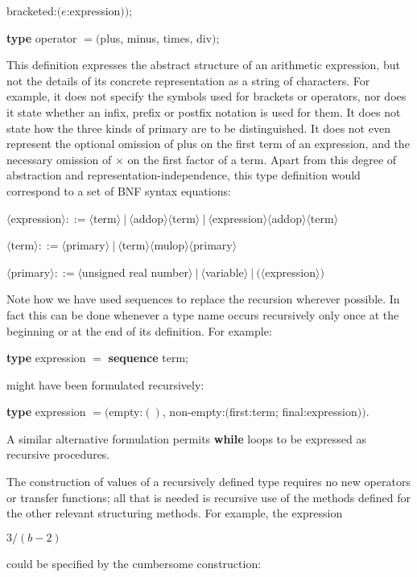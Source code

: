 \tabto*{9.3em}bracketed:$(e$:expression$))$;

\quad \textbf{type} operator $= ($plus, minus, times, div$)$;

This definition expresses the abstract structure of an arithmetic expression, but not the details of its concrete representation as a string of characters. For example, it does not specify the symbols used for brackets or operators, nor does it state whether an infix, prefix or postfix notation is used for them. It does not state how the three kinds of primary are to be distinguished. It does not even represent the optional omission of plus on the first term of an expression, and the necessary omission of $\times$ on the first factor of a term. Apart from this degree of abstraction and representation-independence, this type definition would correspond to a set of BNF syntax equations:

	\quad $\langle$expression$\rangle ::= \langle$term$\rangle\ |\ \langle$addop$\rangle \langle$term$\rangle\ |\ \langle$expression$\rangle \langle$addop$\rangle \langle$term$\rangle$

	\quad $\langle$term$\rangle ::= \langle$primary$\rangle\ |\ \langle$term$\rangle\langle$mulop$\rangle\langle$primary$\rangle$
	
	\quad $\langle$primary$\rangle ::= \langle$unsigned real number$\rangle\ |\ \langle$variable$\rangle\ |\ (\langle$expression$\rangle)$

Note how we have used sequences to replace the recursion wherever possible. In fact this can be done whenever a type name occurs recursively only once at the beginning or at the end of its definition. For example:

\quad \textbf{type} expression $=$ \textbf{sequence} term;

\noindent
might have been formulated recursively:

\quad \textbf{type} expression $= ($empty:$()$, non-empty:$($first:term; final:expression$))$.

\noindent
A similar alternative formulation permits \textbf{while} loops to be expressed as recursive procedures.

The construction of values of a recursively defined type requires no new operators or transfer functions; all that is needed is recursive use of the methods defined for the other relevant structuring methods. For example, the expression

\quad $3/(b - 2)$

\noindent
could be specified by the cumbersome construction:

